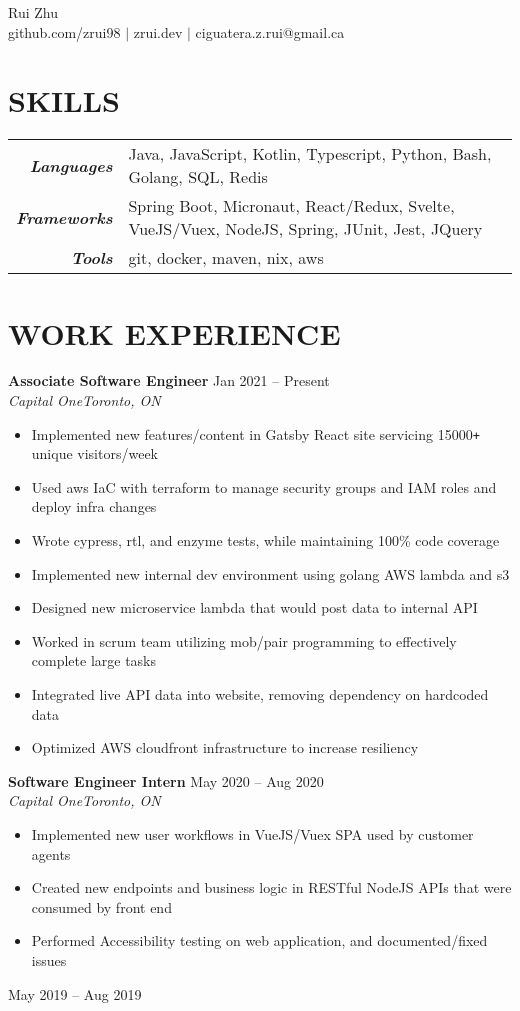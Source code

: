 \documentclass[letterpaper]{article}
\newcommand{\Header}[2]{\begin{center}
	\huge\usefont{OT1}{lmss}{m}{n}
		#1 \\
	\small #2
\end{center}}
\newcommand{\SplitEntry}[2]{\textbf{\textit{#1}} & \small#2\\}
\newcommand{\NewPart}[1]{\section*{\uppercase{\large\textbf{#1}}}}
\newcommand{\DatedEntry}[5]{\textbf{#1}
	\hfill \small#2\\
	\textit{#3}\hfill\textit{#4}\\\vspace{0.1cm}
	#5\vspace{0.1cm}
}
\begin{document}
\Header{Rui Zhu}{github.com/zrui98 $|$ zrui.dev $|$ ciguatera.z.rui@gmail.ca}\vspace{-0.5cm}

\NewPart{Skills}{}
\begin{tabular}{r|l}
	\SplitEntry{Languages}{Java, JavaScript, Kotlin, Typescript, Python, Bash, Golang, SQL, Redis}
	\SplitEntry{Frameworks}{Spring Boot, Micronaut, React/Redux, Svelte, VueJS/Vuex, NodeJS, Spring, JUnit, Jest, JQuery}
	\SplitEntry{Tools}{git, docker, maven, nix, aws}
\end{tabular}\vspace{-0.2cm}

\NewPart{Work Experience}{}
\DatedEntry{Associate Software Engineer}
{Jan 2021 -- Present}
{Capital One}
{Toronto, ON}
{\begin{itemize}[nolistsep]
	\item Implemented new features/content in Gatsby React site servicing 15000\texttt{+} unique visitors/week
	\item Used aws IaC with terraform to manage security groups and IAM roles and deploy infra changes
	\item Wrote cypress, rtl, and enzyme tests, while maintaining 100\% code coverage
	\item Implemented new internal dev environment using golang AWS lambda and s3
	\item Designed new microservice lambda that would post data to internal API
	\item Worked in scrum team utilizing mob/pair programming to effectively complete large tasks
	\item Integrated live API data into website, removing dependency on hardcoded data
	\item Optimized AWS cloudfront infrastructure to increase resiliency
\end{itemize}}
\DatedEntry{Software Engineer Intern}
{May 2020 -- Aug 2020}
{Capital One}
{Toronto, ON}
{\begin{itemize}[nolistsep]
	\item Implemented new user workflows in VueJS/Vuex SPA used by customer agents
	\item Created new endpoints and business logic in RESTful NodeJS APIs that were consumed by front end
	\item Performed Accessibility testing on web application, and documented/fixed issues
\end{itemize}}
{May 2019 -- Aug 2019}
\end{document}
